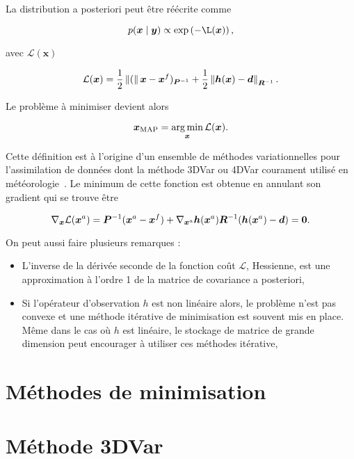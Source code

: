 La distribution a posteriori peut être réécrite comme

\begin{equation*}
    p(\bm x \mid \bm y) \propto \exp\left(- \mathcal{\L}(\bm x)\right),
\end{equation*}

avec $\mathcal L(\bm x)$

\begin{equation*}
    \mathcal L(\bm x) = \frac12 \left\lVert ( \right\rVert\bm x - \bm x^f)_{ \bm{P}^{-1}} + \frac12 \left\lVert \bm h(\bm x) - \bm d \right\rVert_{\bm{R}^{-1}}.
\end{equation*}

Le problème à minimiser devient alors

\begin{equation*}
    \bm x_{\text{MAP}} = \operatorname*{arg\,min}_{\bm x} \mathcal L(\bm x).
\end{equation*}

Cette définition est à l'origine d'un ensemble de méthodes variationnelles pour l'assimilation de données dont la méthode 3DVar ou 4DVar courament utilisé en météorologie~\cite{talagrand1997assimilation}.
Le minimum de cette fonction est obtenue en annulant son gradient qui se trouve être

\begin{equation*}
    \nabla_{\bm{x}} \mathcal L(\bm{x}^a) = \bm{P}^{-1} (\bm{x}^a - \bm{x}^f) + \nabla_{\bm{x}^a} \bm h (\bm{x}^a) \bm{R}^{-1}(\bm{h}(\bm{x}^a) - \bm d) = \bm 0.
\end{equation*}


On peut aussi faire plusieurs remarques :

\begin{itemize}
    \item L'inverse de la dérivée seconde de la fonction coût $\mathcal L$, Hessienne, est une approximation à l'ordre 1 de la matrice de covariance a posteriori,
    \item Si l'opérateur d'observation $h$ est non linéaire alors, le problème n'est pas convexe et une méthode itérative de minimisation est souvent mis en place. Même dans le cas où $h$ est linéaire, le stockage de matrice de grande dimension peut encourager à utiliser ces méthodes itérative,
\end{itemize}

\section{Méthodes de minimisation}

\section{Méthode 3DVar}

